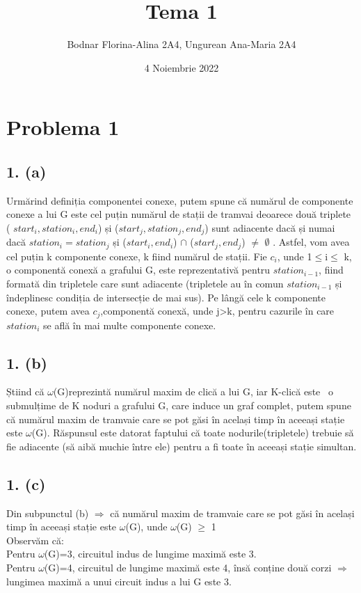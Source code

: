 \documentclass[12pt] {fphw}
\title{Tema 1}
\author{Bodnar Florina-Alina 2A4, Ungurean Ana-Maria 2A4 } %
\date{4 Noiembrie 2022} %
\institute{Universitatea Alexandru Ioan-Cuza \\ Facultatea de Informatică} %
\begin{document}
\maketitle 

\section*{Problema 1}
\subsection*{1. (a)} 
 
Urmărind definiția componentei conexe, putem spune că numărul de componente conexe a lui G este cel puțin numărul de stații de tramvai deoarece două triplete ( ${}start_i, station_i, end_i$) și (${}start_j, station_j, end_j$) sunt adiacente dacă și numai dacă ${}station_i=station_j$ și (${}start_i, end_i$) $\cap$  (${}start_j, end_j$) $\neq$  $\emptyset$ . Astfel, vom avea cel puțin k componente conexe, k fiind numărul de stații.  Fie ${}c_i$, unde 1$\leq$i$\leq$ k, o componentă conexă a grafului G, este reprezentativă pentru ${}station_{i-1}$,
fiind formată din tripletele care sunt adiacente (tripletele au în comun  ${}station_{i-1}$ 
și îndeplinesc condiția de intersecție de mai sus). Pe lângă cele k componente conexe, putem avea ${}c_j$,componentă conexă, unde j>k,  pentru cazurile în care  ${}station_i$ se află în  mai multe componente conexe.  

\subsection*{1. (b)}

Știind că $\omega$(G)reprezintă numărul maxim de clică a lui G, iar K-clică este \ o submulțime de K noduri a grafului G, care induce un graf complet, putem spune că numărul maxim de tramvaie care se pot găsi în același timp în aceeași stație este  $\omega$(G). Răspunsul este datorat faptului că toate nodurile(tripletele) trebuie să fie adiacente (să aibă muchie între ele) pentru a fi toate în aceeași stație simultan.  

\subsection*{1. (c)}
Din subpunctul (b) $\Longrightarrow$ că numărul maxim de tramvaie care se pot găsi în același timp în aceeași stație este $\omega$(G), unde $\omega$(G) $\geq$ 1 \\ Observăm că: \\ Pentru  
$\omega$(G)=3, circuitul indus de lungime maximă este 3. \\ Pentru $\omega$(G)=4, circuitul de lungime maximă este 4, însă conține două corzi $\Longrightarrow$ lungimea maximă a unui circuit indus a lui G este 3. 
 
\end{document}
